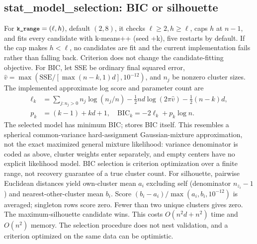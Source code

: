 \documentclass[conference]{IEEEtran}
\begin{document}
\subsection{stat\_model\_selection: BIC or silhouette}
For \(\texttt{\small k\_range}=(\ell,h)\), default \((2,8)\), it checks \(\ell\ge2, h\ge\ell\), caps \(h\) at \(n-1\), and fits every candidate with k-means++ (seed +k), five restarts by default. If the cap makes \(h<\ell\), no candidates are fit and the current implementation fails rather than falling back. Criterion does not change the candidate-fitting objective.
For BIC, let SSE be ordinary final squared error, \(\hat v=\max(\mathrm{SSE}/[\max(n-k,1)d],10^{-12})\), and \(n_j\) be nonzero cluster sizes. The implemented approximate log score and parameter count are
\begin{align*}\ell_k&=\sum_{j:n_j>0}n_j\log(n_j/n)-\tfrac12nd\log(2\pi\hat v)-\tfrac12(n-k)d,\\
p_k&=(k-1)+kd+1,\quad \mathrm{BIC}_k=-2\ell_k+p_k\log n.
\end{align*}
The selected model has minimum BIC;  stores BIC itself. This resembles a spherical common-variance hard-assignment Gaussian-mixture approximation, not the exact maximized general mixture likelihood: variance denominator is coded as above, cluster weights enter separately, and empty centers have no explicit likelihood model. BIC selection is criterion optimization over a finite range, not recovery guarantee of a true cluster count.
For silhouette, pairwise Euclidean distances yield own-cluster mean \(a_i\) excluding self (denominator \(n_{z_i}-1\)) and nearest-other-cluster mean \(b_i\). Score \((b_i-a_i)/\max(a_i,b_i,10^{-12})\) is averaged; singleton rows score zero. Fewer than two unique clusters gives zero. The maximum-silhouette candidate wins. This costs \(O(n^2d+n^2)\) time and \(O(n^2)\) memory. The selection procedure does not nest validation, and a criterion optimized on the same data can be optimistic.
\end{document}
